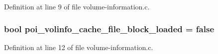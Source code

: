 Definition at line 9 of file volume-\/information.\-c.

\hypertarget{volume-information_8c_a3884cefaefb7b0de464dde64e1a9226d}{
\subsubsection[{poi\-\_\-volinfo\-\_\-cache\-\_\-file\-\_\-block\-\_\-loaded}]{\setlength{\rightskip}{0pt plus 5cm}bool poi\-\_\-volinfo\-\_\-cache\-\_\-file\-\_\-block\-\_\-loaded = false}}\label{volume-information_8c_a3884cefaefb7b0de464dde64e1a9226d}


Definition at line 12 of file volume-\/information.\-c.

